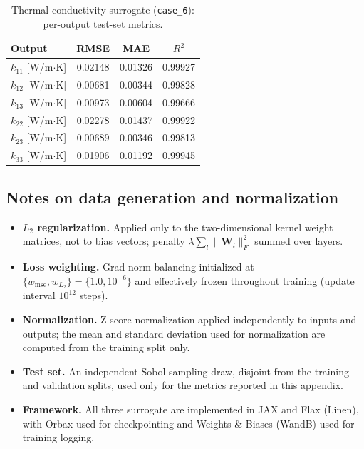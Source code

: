 \documentclass[preprint,review,10pt,number]{elsarticle}
\begin{document}
\begin{table}[h]
\centering
\caption{Thermal conductivity surrogate (\texttt{case\_6}): per-output test-set metrics.}
\label{tab:app_thermal_per_output}
\begin{tabular}{lccc}
\toprule
Output & RMSE & MAE & $R^2$ \\
\midrule
$k_{11}$ [W/m$\cdot$K] & 0.02148 & 0.01326 & 0.99927 \\
$k_{12}$ [W/m$\cdot$K] & 0.00681 & 0.00344 & 0.99828 \\
$k_{13}$ [W/m$\cdot$K] & 0.00973 & 0.00604 & 0.99666 \\
$k_{22}$ [W/m$\cdot$K] & 0.02278 & 0.01437 & 0.99922 \\
$k_{23}$ [W/m$\cdot$K] & 0.00689 & 0.00346 & 0.99813 \\
$k_{33}$ [W/m$\cdot$K] & 0.01906 & 0.01192 & 0.99945 \\
\bottomrule
\end{tabular}
\end{table}

\FloatBarrier
\subsection{Notes on data generation and normalization}
\label{app:surrogate_notes}

\begin{itemize}[leftmargin=*]
    \item \textbf{$L_2$ regularization.} Applied only to the
    two-dimensional kernel weight matrices, not to bias vectors;
    penalty $\lambda \sum_l \lVert \mathbf{W}_l \rVert_F^2$ summed
    over layers.
    \item \textbf{Loss weighting.} Grad-norm balancing initialized at
    $\{w_{\text{mse}}, w_{L_2}\} = \{1.0, 10^{-6}\}$ and effectively
    frozen throughout training (update interval $10^{12}$ steps).
    \item \textbf{Normalization.} Z-score normalization applied
    independently to inputs and outputs; the mean and standard deviation used for normalization are computed from the training split only.
    \item \textbf{Test set.} An independent Sobol sampling draw, disjoint from the training and validation splits, used only for the metrics reported in this appendix.
    \item \textbf{Framework.} All three surrogate are implemented in JAX and Flax (Linen), with Orbax used for checkpointing and
    Weights \& Biases (WandB) used for training logging.
\end{itemize}
\end{document}
